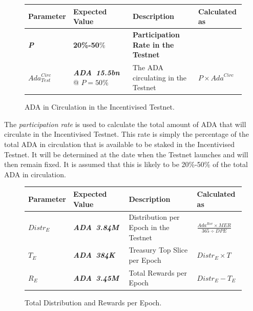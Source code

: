 \documentclass[11pt,a4paper,dvipsnames,twosided,final]{article}
\newcommand{\khcomment}[1]{\todo[color=blue!20]{KH: #1}}
\newcommand{\ada}{ADA{}}
\newcommand{\ADA}[1]{\textbf{\emph{\ada~{#1}}}}
\begin{document}
\begin{figure}[h!]
\begin{center}
\begin{tabular}{||l|l|p{6cm}|l||}
  \hline \hline
\textbf{Parameter} & \textbf{Expected Value} & \textbf{Description} & \textbf{Calculated as} \\\hline
\textbf{\color{blue} \emph{P}} & \textbf{\color{blue} 20\%-50}\% & \textbf{\color{blue} Participation Rate in the Testnet} & \\\hline
$\textit{Ada}^{\textit{Circ}}_{\textit{Test}}$ & \ADA{15.5bn} @ $P=50\%$ & The \ada{} circulating in the Testnet & $P \times \textit{Ada}^{\textit{Circ}}$ \\\hline
  \hline
\end{tabular}
\end{center}
\caption{\ada{} in Circulation in the Incentivised Testnet.}
\end{figure}

\noindent
The \emph{participation rate} is used to calculate the total amount of \ada{} that will circulate in the Incentivised Testnet.
This rate is simply the percentage of the total \ada{} in  circulation that is available to be staked in the Incentivised Testnet.
It will be determined at the date when the
Testnet launches and will then remain fixed.
It is assumed that this is likely to be 20\%-50\% of the total \ada{} in circulation.


\begin{figure}[h!]
\begin{center}
\begin{tabular}{||l|l|p{6cm}|l||}
  \hline \hline
\textbf{Parameter} & \textbf{Expected Value} & \textbf{Description} & \textbf{Calculated as} \\\hline
$\textit{Distr}_E$ & \ADA{3.84M} & Distribution per Epoch in the Testnet & $\frac{\textit{Ada}^{\textit{Rsv}} \times \textit{MER}}{365 \div \textit{DPE}}$ \\\hline
$T_E$ & \ADA{384K} & Treasury Top Slice per Epoch & $\textit{Distr}_E \times T$ \\\hline
$R_E$ & \ADA{3.45M} & Total Rewards per Epoch & $\textit{Distr}_E - T_E$ \\\hline
  \hline
\end{tabular}
\end{center}
\caption{Total Distribution and Rewards per Epoch.}
\label{fig:distrib}
\end{figure}
\end{document}
